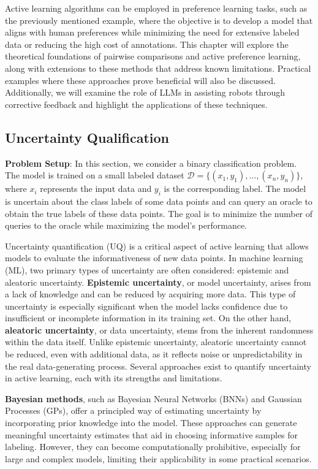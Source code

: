 \documentclass[
  letterpaper,
  numbers=noenddot,
  DIV=11]{scrreprt}
\theoremstyle{definition}
\theoremstyle{plain}
\theoremstyle{plain}
\theoremstyle{remark}
\begin{document}
Active learning algorithms can be employed in preference learning tasks,
such as the previously mentioned example, where the objective is to
develop a model that aligns with human preferences while minimizing the
need for extensive labeled data or reducing the high cost of
annotations. This chapter will explore the theoretical foundations of
pairwise comparisons and active preference learning, along with
extensions to these methods that address known limitations. Practical
examples where these approaches prove beneficial will also be discussed.
Additionally, we will examine the role of LLMs in assisting robots
through corrective feedback and highlight the applications of these
techniques.

\subsection{Uncertainty Qualification}\label{uncertainty-qualification}

\textbf{Problem Setup}: In this section, we consider a binary
classification problem. The model is trained on a small labeled dataset
\(\mathcal{D} = \{(x_1, y_1), \ldots, (x_n, y_n)\}\), where \(x_i\)
represents the input data and \(y_i\) is the corresponding label. The
model is uncertain about the class labels of some data points and can
query an oracle to obtain the true labels of these data points. The goal
is to minimize the number of queries to the oracle while maximizing the
model's performance.

Uncertainty quantification (UQ) is a critical aspect of active learning
that allows models to evaluate the informativeness of new data points.
In machine learning (ML), two primary types of uncertainty are often
considered: epistemic and aleatoric uncertainty. \textbf{Epistemic
uncertainty}, or model uncertainty, arises from a lack of knowledge and
can be reduced by acquiring more data. This type of uncertainty is
especially significant when the model lacks confidence due to
insufficient or incomplete information in its training set. On the other
hand, \textbf{aleatoric uncertainty}, or data uncertainty, stems from
the inherent randomness within the data itself. Unlike epistemic
uncertainty, aleatoric uncertainty cannot be reduced, even with
additional data, as it reflects noise or unpredictability in the real
data-generating process. Several approaches exist to quantify
uncertainty in active learning, each with its strengths and limitations.

\textbf{Bayesian methods}, such as Bayesian Neural Networks (BNNs) and
Gaussian Processes (GPs), offer a principled way of estimating
uncertainty by incorporating prior knowledge into the model. These
approaches can generate meaningful uncertainty estimates that aid in
choosing informative samples for labeling. However, they can become
computationally prohibitive, especially for large and complex models,
limiting their applicability in some practical scenarios.
\end{document}
